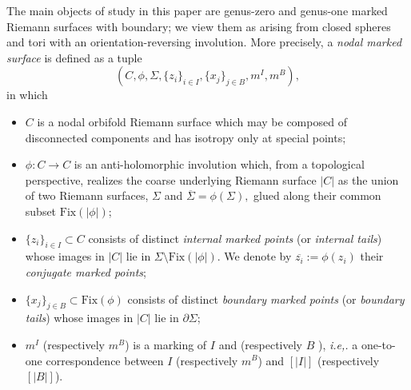 \documentclass[11pt]{amsart}
\theoremstyle{definition}
\theoremstyle{remark}
\newcommand{\<}{\left<}
\renewcommand{\>}{\right>}
\numberwithin{equation}{section}
\begin{document}
The main objects of study in this paper are genus-zero and genus-one marked Riemann surfaces with boundary; we view them as arising from closed spheres %
and tori with %
an orientation-reversing involution. %
More precisely, a \textit{nodal marked surface} is defined as a %
tuple
$$(C, \phi, \Sigma, \{z_i\}_{i \in I}, \{x_j\}_{j \in B}, m^I, m^B),$$
in %
which
\begin{itemize}
\item  $C$ is a nodal orbifold %
Riemann surface which %
may be composed of %
disconnected components and %
has isotropy only at special points;
\item $\phi: C \to C$ is an anti-holomorphic involution which, from a topological perspective, realizes the coarse underlying Riemann surface $|C|$  as the union of two Riemann surfaces, $\Sigma$ and $\overline{\Sigma}=\phi(\Sigma),$ glued along their common subset $\text{Fix}(|\phi|)$;
\item $\{z_i\}_{i \in I}\subset  C$ consists of distinct \textit{internal marked points} (or \textit{internal tails}) whose images in $|C|$ lie in $\Sigma\setminus\text{Fix}(|\phi|)$. We denote by $\overline{z_i}:= \phi(z_i)$ their \textit{conjugate marked points};
\item $\{x_j\}_{j \in B} \subset \text{Fix}(\phi)$ consists of distinct \textit{boundary marked points} (or \textit{boundary tails}) whose images in $|C|$ lie in ${\partial} \Sigma$;
\item $m^I$ (respectively $m^B$) is a marking of $I$ and (respectively $B$%
), \textit{i.e,.} a %
one-to-one correspondence between  $I$ (respectively $m^B$) and $\left[\lvert I \rvert\right]$ (respectively $[\lvert B \rvert]$).
\end{itemize}
\end{document}
